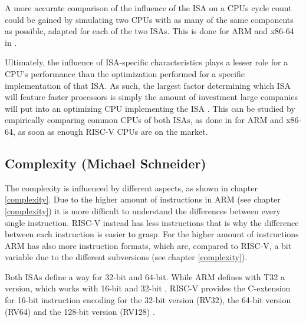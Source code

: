 \documentclass[conference]{IEEEtran}
\begin{document}
	A more accurate comparison of the influence of the \gls{ISA} on a \gls{CPU}s cycle count could be gained
	by simulating two \glspl{CPU} with as many of the same components as possible, adapted for each of the two \glspl{ISA}.
	This is done for ARM and x86-64 in \cite{Akram2017}.

	Ultimately, the influence of \gls{ISA}-specific characteristics plays a lesser role for a \gls{CPU}'s performance
	than the optimization performed for a specific implementation of that \gls{ISA}.
	As such, the largest factor determining which \gls{ISA} will feature faster processors is simply the amount of investment
	large companies will put into an optimizing \gls{CPU} implementing the \gls{ISA} \cite{Blem2013}.
	This can be studied by empirically comparing common \glspl{CPU} of both \glspl{ISA}, as done in \cite{Blem2013} for ARM and
	x86-64, as soon as enough RISC-V \glspl{CPU} are on the market.
	
	\subsection{Complexity (Michael Schneider)}
	The complexity is influenced by different aspects, as shown in chapter \ref{complexity}.
	 Due to the higher amount of instructions in ARM (see chapter \ref{complexity}) it is more difficult to understand the differences between every single instruction. RISC-V instead has less instructions that is why the difference between each instruction is easier to grasp. 
	 For the higher amount of instructions ARM has also more instruction formats, which are, compared to RISC-V, a bit variable due to the different subversions (see chapter \ref{complexity}).
	
	Both \glspl{ISA} define a way for 32-bit and 64-bit. While ARM defines with T32 a version, which works with 16-bit and 32-bit \cite[page 38]{Arm2020}, RISC-V provides the C-extension for 16-bit instruction encoding for the 32-bit version (RV32), the 64-bit version (RV64) and the 128-bit version (RV128) \cite[page67]{Waterman2017}.
\end{document}
